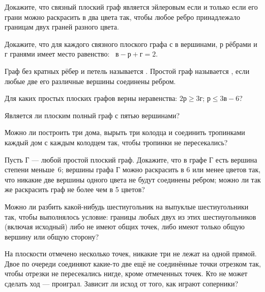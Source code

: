 \documentclass[a4paper,11pt]{article}
\begin{document}
Докажите, что связный плоский граф является эйлеровым
если и только если его грани можно раскрасить в два цвета так,
чтобы любое ребро принадлежало границам двух граней разного цвета.

Докажите, что для каждого связного плоского графа с $в$ вершинами,
$р$ р\"ебрами и $г$ гранями имеет место равенство: \ $в-р+г=2$.

Граф без кратных рёбер и петель называется .
Простой граф называется , если любые две его различные вершины
соединены ребром.

Для каких простых плоских графов верны неравенства:
 $2р\geq3г$;
 $р\leq3в-6$?



Является ли плоским полный граф с пятью вершинами?

Можно ли построить три дома, вырыть три колодца и соединить тропинками каждый
дом с каждым колодцем так, чтобы тропинки не пересекались?


Пусть $Г$ --- любой простой плоский граф. Докажите, что
в графе $Г$ есть вершина степени меньше~6;
 вершины графа $Г$ можно %
раскрасить
в 6 или менее цветов так, что никакие две вершины одного цвета
не будут соединены ребром;
 можно ли так же раскрасить граф не более чем в 5 цветов?



Можно ли разбить какой-нибудь шестиугольник на выпуклые шестиугольники
так, чтобы выполнялось условие: границы любых двух из этих шестиугольников
(включая исходный) либо не имеют общих точек,
либо имеют только общую вершину или общую сторону?

На плоскости отмечено несколько точек, никакие три %
не лежат на одной прямой. Двое %
по очереди соединяют какие-то две ещ\"е не соедин\"енные
точки отрезком так, чтобы отрезки не пересекались нигде, кроме
отмеченных точек. Кто не может сделать ход --- проиграл.
Зависит ли исход от того, как играют соперники?
\end{document}
